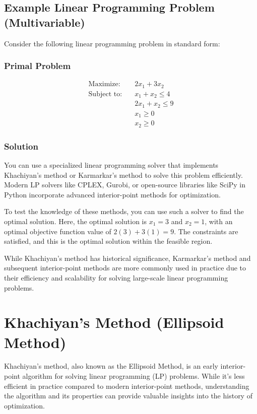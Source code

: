 \documentclass[a4paper]{article}
\begin{document}
\subsection{Example Linear Programming Problem (Multivariable)}

Consider the following linear programming problem in standard form:

\subsubsection{Primal Problem}
\begin{align*}
\text{Maximize:} \quad & 2x_1 + 3x_2 \\
\text{Subject to:} \quad & x_1 + x_2 \leq 4 \\
& 2x_1 + x_2 \leq 9 \\
& x_1 \geq 0 \\
& x_2 \geq 0
\end{align*}

\subsubsection{Solution}

You can use a specialized linear programming solver that implements Khachiyan's method or Karmarkar's method to solve this problem efficiently. Modern LP solvers like CPLEX, Gurobi, or open-source libraries like SciPy in Python incorporate advanced interior-point methods for optimization.

To test the knowledge of these methods, you can use such a solver to find the optimal solution. Here, the optimal solution is $x_1 = 3$ and $x_2 = 1$, with an optimal objective function value of $2(3) + 3(1) = 9$. The constraints are satisfied, and this is the optimal solution within the feasible region.

While Khachiyan's method has historical significance, Karmarkar's method and subsequent interior-point methods are more commonly used in practice due to their efficiency and scalability for solving large-scale linear programming problems.

\section{Khachiyan's Method (Ellipsoid Method)}

Khachiyan's method, also known as the Ellipsoid Method, is an early interior-point algorithm for solving linear programming (LP) problems. While it's less efficient in practice compared to modern interior-point methods, understanding the algorithm and its properties can provide valuable insights into the history of optimization.
\end{document}
